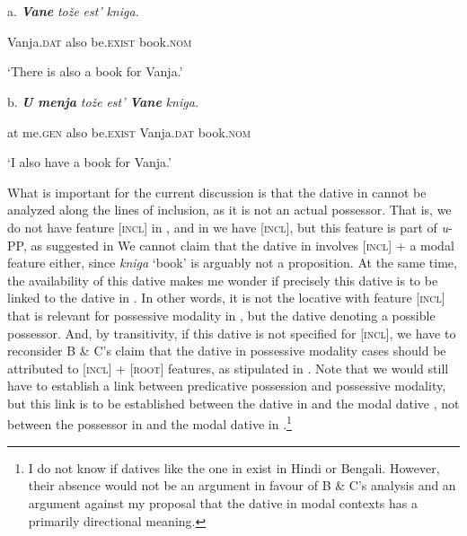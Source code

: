 \documentclass[output=paper,colorlinks,citecolor=brown]{./langscibook}
\begin{document}
\ea%
    \label{ex:tsedryk:13}
    \gll\\
        \\
    \glt
    \z

          a.  \textbf{\textit{Vane}}         \textit{tože}    \textit{est’}           \textit{kniga.}

    Vanja.\textsc{dat}   also   be.\textsc{exist}   book.\textsc{nom}

    ‘There is also a book for Vanja.’

  b.  \textbf{\textit{U} \textit{menja}}     \textit{tože}   \textit{est’}           \textbf{\textit{Vane}}         \textit{kniga.}

    at me.\textsc{gen}    also   be.\textsc{exist}   Vanja.\textsc{dat}   book.\textsc{nom}

    ‘I also have a book for Vanja.’       

What is important for the current discussion is that the dative in  cannot be analyzed along the lines of inclusion, as it is not an actual possessor. That is, we do not have feature [\textsc{incl}] in , and in  we have [\textsc{incl}], but this feature is part of \textit{u}{}-PP, as suggested in  We cannot claim that the dative in  involves [\textsc{incl}] + a modal feature either, since \textit{kniga} ‘book’ is arguably not a proposition. At the same time, the availability of this dative makes me wonder if precisely this dative is to be linked to the dative in . In other words, it is not the locative with feature [\textsc{incl}] that is relevant for possessive modality in , but the dative denoting a possible possessor. And, by transitivity, if this dative is not specified for [\textsc{incl}], we have to reconsider B \& C’s claim that the dative in possessive modality cases should be attributed to [\textsc{incl}] + [\textsc{root}] features, as stipulated in . Note that we would still have to establish a link between predicative possession and possessive modality, but this link is to be established between the dative in  and the modal dative , not between the possessor in  and the modal dative in .\footnote{I do not know if datives like the one in  exist in Hindi or Bengali. However, their absence would not be an argument in favour of B \& C’s analysis and an argument against my proposal that the dative in modal contexts has a primarily directional meaning.}   
\end{document}
